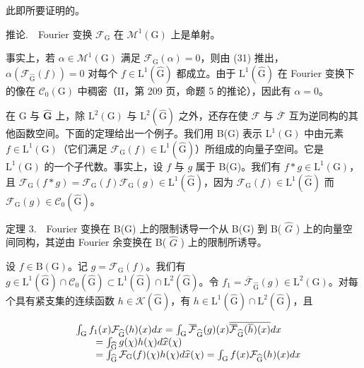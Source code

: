 此即所要证明的。

推论.　Fourier 变换 \(\mathcal{F}_{\mathrm{G}}\) 在 \(\mathcal{M}^{1}(\mathrm{G})\) 上是单射。

事实上，若 \(\alpha \in \mathcal{M}^1 (\mathrm{G})\) 满足 \(\mathcal{F}_{\mathrm{G}}(\alpha) = 0\)，则由 (31) 推出，\(\alpha (\mathcal{F}_{\widehat{\mathrm{G}}} (f)) = 0\) 对每个 \(f\in \mathrm{L}^{1}(\widehat{\mathrm{G}})\) 都成立。由于 \(\mathrm{L}^1 (\widehat{\mathrm{G}})\) 在 Fourier 变换下的像在 \(\mathcal{C}_0(\mathrm{G})\) 中稠密（II，第 209 页，命题 5 的推论），因此有 \(\alpha = 0\)。

在 G 与 \(\widehat{\mathbf{G}}\) 上，除 \(\mathrm{L}^2 (\mathrm{G})\) 与 \(\mathrm{L}^2 (\widehat{\mathrm{G}})\) 之外，还存在使 \(\mathcal{F}\) 与 \(\overline{\mathcal{F}}\) 互为逆同构的其他函数空间。下面的定理给出一个例子。我们用 B(G) 表示 \(\mathrm{L}^1 (\mathrm{G})\) 中由元素 \(f\in \mathrm{L}^1 (\mathrm{G})\)（它们满足 \(\mathcal{F}_{\mathrm{G}}(f)\in \mathrm{L}^1 (\widehat{\mathrm{G}})\)）所组成的向量子空间。它是 \(\mathrm{L}^1 (\mathrm{G})\) 的一个子代数。事实上，设 \(f\) 与 \(g\) 属于 B(G)。我们有 \(f*g\in \mathrm{L}^1 (\mathrm{G})\)，且 \(\mathcal{F}_{\mathrm{G}}(f*g) = \mathcal{F}_{\mathrm{G}}(f)\mathcal{F}_{\mathrm{G}}(g)\in \mathrm{L}^1 (\widehat{\mathrm{G}})\)，因为 \(\mathcal{F}_{\mathrm{G}}(f)\in \mathrm{L}^1 (\widehat{\mathrm{G}})\) 而 \(\mathcal{F}_{\mathrm{G}}(g)\in \mathcal{C}_0(\widehat{\mathrm{G}})\)。

定理 3.　Fourier 变换在 B(G) 上的限制诱导一个从 B(G) 到 B( \(\widehat{G}\) ) 上的向量空间同构，其逆由 Fourier 余变换在 B( \(\widehat{G}\) ) 上的限制所诱导。

设 \(f \in \mathrm{B}(\mathrm{G})\)。记 \(g = \mathcal{F}_{\mathrm{G}}(f)\)。我们有 \(g \in \mathrm{L}^1(\widehat{\mathrm{G}}) \cap \mathcal{C}_0(\widehat{\mathrm{G}}) \subset \mathrm{L}^1(\widehat{\mathrm{G}}) \cap \mathrm{L}^2(\widehat{\mathrm{G}})\)。令 \(f_1 = \overline{\mathcal{F}}_{\widehat{\mathrm{G}}} (g) \in \mathrm{L}^2(\mathrm{G})\)。对每个具有紧支集的连续函数 \(h \in \mathcal{K}(\widehat{\mathrm{G}})\)，有 \(h \in \mathrm{L}^1(\widehat{\mathrm{G}}) \cap \mathrm{L}^2(\widehat{\mathrm{G}})\)，且

\[
\begin{array}{r l} & {\int_ {\mathrm{G}} f _ {1} (x) \mathcal {F} _ {\widehat {\mathrm{G}}} (h) (x) d x = \int_ {\mathrm{G}} \overline {{\mathcal {F}}} _ {\widehat {\mathrm{G}}} (g) (x) \overline {{\overline {{\mathcal {F}}} _ {\widehat {\mathrm{G}}} (\overline {{h}}) (x)}} d x} \\ & {\qquad = \int_ {\widehat {\mathrm{G}}} g (\chi) h (\chi) d \widehat {x} (\chi)} \\ & {\qquad = \int_ {\widehat {\mathrm{G}}} \mathcal {F} _ {\mathrm{G}} (f) (\chi) h (\chi) d \widehat {x} (\chi) = \int_ {\mathrm{G}} f (x) \mathcal {F} _ {\widehat {\mathrm{G}}} (h) (x) d x} \end{array}
\]

